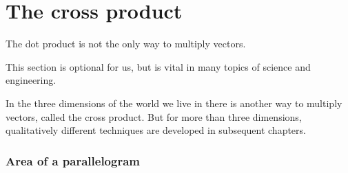 \section{The cross product}
\label{sec:cp}
\secttoc



The dot product is not the only way to multiply vectors.
\begin{aside}
This section is optional for us, 
but is vital in many topics of science and engineering.
\end{aside}%
In the three dimensions of the world we live in there is another way to multiply vectors, called the cross product.
But for more than three dimensions, qualitatively different techniques are developed in subsequent chapters.


\subsubsection{Area of a parallelogram}


